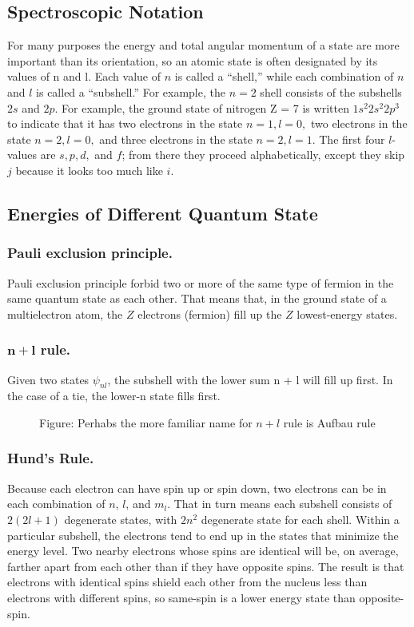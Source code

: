 \documentclass[../../../main.tex]{subfiles}
\begin{document}
\subsection{Spectroscopic Notation} 
For many purposes the energy and total angular momentum of a state are more important than its orientation, so an atomic state is often designated by its values of n and l. Each value of $n$ is called a “shell,” while each combination of $n$ and $l$ is called a “subshell.” For example, the $n = 2$ shell consists of the subshells $2s$ and $2p$. For example, the ground state of nitrogen Z = 7 is written $1s^2 2s^2 2p^3$ to indicate that it has two electrons in the state $n = 1, l = 0,$ two electrons in the state $n = 2, l = 0,$ and three electrons in the state $n = 2, l = 1$. The first four $l$-values are $s, p, d,$ and $f$; from there they proceed alphabetically, except they skip $j$ because it looks too much like $i$.

\subsection{Energies of Different Quantum State}
\subsubsection{Pauli exclusion principle.} Pauli exclusion principle forbid two or more of the same type of fermion in the same quantum state as each other. That means that, in the ground state of a multielectron atom, the $Z$ electrons (fermion) fill up the $Z$ lowest-energy states.

\subsubsection{$\boldsymbol{n + l}$ rule.} Given two states $\psi_{nl}$, the subshell with the lower sum n + l will fill up first. In the case of a tie, the lower-n state fills first.
\begin{figure}[b]
    \centering
    \caption*{Figure: Perhabs the more familiar name for $n+l$ rule is Aufbau rule}
\end{figure}

\subsubsection{Hund's Rule.} Because each electron can have spin up or spin down, two electrons can be in each
combination of $n$, $l$, and $m_l$. That in turn means each subshell consists of $2(2l + 1)$ degenerate states, with $2n^2$ degenerate state for each shell. Within a particular subshell, the electrons tend to end up in the states that minimize the energy level. Two nearby electrons whose spins are identical will be, on average, farther apart from each other than if they have opposite spins. The result is that electrons with identical spins shield each other from the nucleus less than electrons with different spins, so same-spin is a lower energy state than opposite-spin.
\end{document}
